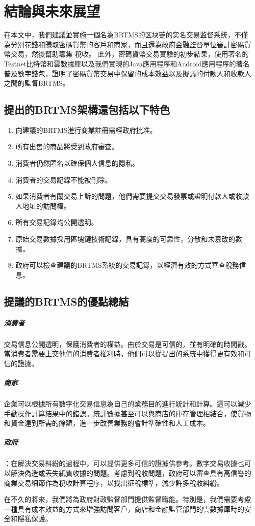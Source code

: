 
\chapter{結論與未來展望}
在本文中，我們建議並實施一個名為BRTMS的区块链的实名交易监督系统，不僅為分別花錢和賺取密碼貨幣的客戶和商家，而且還為政府金融監督單位審計密碼貨幣交易，然後幫助籌集 稅收。 此外，密碼貨幣交易實驗的初步結果，使用著名的Testnet比特幣和雲數據庫以及我們實現的Java應用程序和Android應用程序的著名普及數字錢包，證明了密碼貨幣交易中保留的成本效益以及擬議的付款人和收款人之間的監督BRTMS。
	
	\section{提出的BRTMS架構還包括以下特色}
		\begin{enumerate}
			\item 向建議的BRTMS進行商業註冊需經政府批准。
			\item 所有出售的商品將受到政府審查。
			\item 消費者仍然匿名以確保個人信息的隱私。
			\item 消費者的交易記錄不能被刪除。
			\item 如果消費者有關交易上訴的問題，他們需要提交交易發票或證明付款人或收款人地址的訪問權。
			\item 所有交易記錄均公開透明。
			\item 原始交易數據採用區塊鏈技術記錄，具有高度的可靠性，分散和未篡改的數據。
			\item 政府可以檢查建議的BRTMS系統的交易記錄，以經濟有效的方式審查稅務信息。
		\end{enumerate}

	\section{提議的BRTMS的優點總結}

		\paragraph{消費者}交易信息公開透明，保護消費者的權益。由於交易是可信的，並有明確的時間戳。當消費者需要上交他們的消費者權利時，他們可以從提出的系統中獲得更有效和可信的證據。
		\paragraph{商家}企業可以根據所有數字化交易信息為自己的業務目的進行統計和計算。這可以減少手動操作計算結果中的錯誤。統計數據甚至可以與商店的庫存管理相結合，使貨物和資金達到所需的餘額，進一步改善業務的會計準確性和人工成本。
		\paragraph{政府}：在解決交易糾紛的過程中，可以提供更多可信的證據供參考。數字交易收據也可以解決偽造或丟失紙質收據的問題。考慮到稅收問題，政府可以審查具有高信譽的商業交易細節作為稅收計算程序，以找出征稅標準，減少許多稅收糾紛。

在不久的將來，我們將為政府財政監督部門提供監督職能。特別是，我們需要考慮一種具有成本效益的方式來增強訪問客戶，商店和金融監管部門的雲數據庫時的安全和隱私保護。

